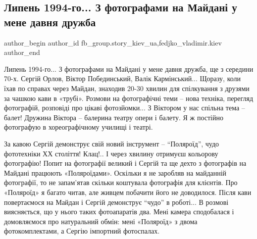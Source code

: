  
 
 
 
 
 
\subsection{Липень 1994-го... З фотографами на Майдані у мене давня дружба}
\label{sec:05_12_2021.fb.fb_group.story_kiev_ua.2.1994_maidan_foto}
 
\ifcmt
 author_begin
   author_id fb_group.story_kiev_ua,fedjko_vladimir.kiev
 author_end
\fi

Липень 1994-го... З фотографами на Майдані у мене давня дружба, ще з середини
70-х. Сергій Орлов, Віктор Побединський, Валік Кармінський... Щоразу, коли їхав
по справах через Майдан, знаходив 20-30 хвилин для спілкування з друзями за
чашкою кави в «трубі». Розмови на фотографічні теми – нова техніка, перегляд
фотографій, розповіді про цікаві фотозйомки... З Віктором у нас спільна тема –
балет! Дружина Віктора – балерина театру опери і балету. Я ж постійно
фотографую в хореографічному училищі і театрі. 

\begin{multicols}{2} %
\setlength{\parindent}{0pt}


\end{multicols} %

За кавою Сергій демонструє свій новий інструмент – \enquote{Поляроїд}, чудо фототехніки
ХХ століття! Клац!.. І через хвилину отримуєш кольорову фотографію! Попит на
фотографії великий і Сергій та ще дехто з фотографів на Майдані працюють
«Поляроїдами». Оскільки я не заробляв на майданній фотографії, то не запам’ятав
скільки коштувала фотографія для клієнтів. Про «Поляроїд» я багато читав, але
живцем побачити його не доводилося.  Після кави повертаємося на Майдан і Сергій
демонструє \enquote{чудо} в роботі... В розмові виясняється, що у нього таких
фотоапаратів два. Мені камера сподобалася і домовляємося про натуральний обмін:
мені «Поляроїд» з двома фотокомплектами, а Сергію імпортний фотоспалах.

